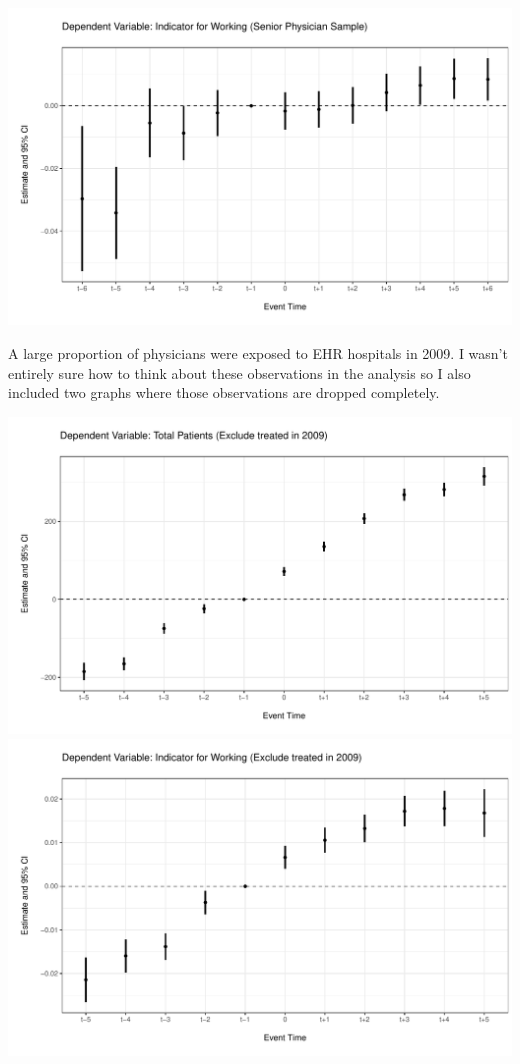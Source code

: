 \documentclass[11pt]{article}
\begin{document}
\includegraphics[scale=.7]{Objects/ind_ES_oldsample.pdf}

\newpage

A large proportion of physicians were exposed to EHR hospitals in 2009. I wasn't entirely sure how to think about these observations in the analysis so I also included two graphs where those observations are dropped completely. 

\includegraphics[scale=.7]{Objects/cont_ES_subset2009.pdf}
\includegraphics[scale=.7]{Objects/ind_ES_subset2009.pdf}
\end{document}
